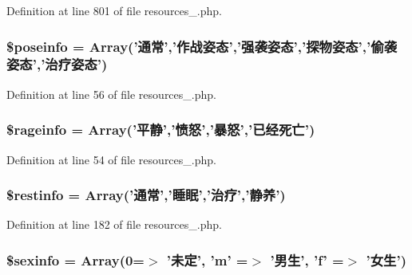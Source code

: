 Definition at line 801 of file resources\+\_.\+php.

\hypertarget{cache_2resources__1_8php_af6cbbc5cff2f1db3093587d7495600ae}{
\subsubsection[{\$poseinfo}]{\setlength{\rightskip}{0pt plus 5cm}\$poseinfo = Array('通常','作战姿态','强袭姿态','探物姿态','偷袭姿态','治疗姿态')}}\label{cache_2resources__1_8php_af6cbbc5cff2f1db3093587d7495600ae}


Definition at line 56 of file resources\+\_.\+php.

\hypertarget{cache_2resources__1_8php_a5f383706ecfe4033fc5ba410b5efe3a0}{
\subsubsection[{\$rageinfo}]{\setlength{\rightskip}{0pt plus 5cm}\$rageinfo = Array('平静','愤怒','暴怒','已经死亡')}}\label{cache_2resources__1_8php_a5f383706ecfe4033fc5ba410b5efe3a0}


Definition at line 54 of file resources\+\_.\+php.

\hypertarget{cache_2resources__1_8php_a9eadda2ba19f193cb5b6d373f4ec6e00}{
\subsubsection[{\$restinfo}]{\setlength{\rightskip}{0pt plus 5cm}\$restinfo = Array('通常','睡眠','治疗','静养')}}\label{cache_2resources__1_8php_a9eadda2ba19f193cb5b6d373f4ec6e00}


Definition at line 182 of file resources\+\_.\+php.

\hypertarget{cache_2resources__1_8php_a7fc213b5009edd4913f9a3f66776c721}{
\subsubsection[{\$sexinfo}]{\setlength{\rightskip}{0pt plus 5cm}\$sexinfo = Array(0=$>$ '未定', 'm' =$>$ '男生', 'f' =$>$ '女生')}}\label{cache_2resources__1_8php_a7fc213b5009edd4913f9a3f66776c721}


